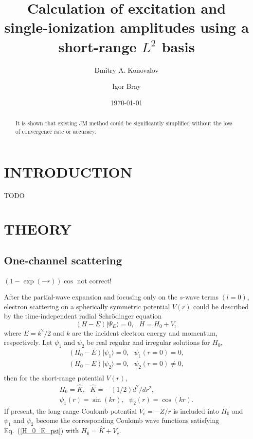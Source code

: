 \documentclass[aip
, pra
, showpacs
, aps
, twocolumn
, groupedaddress
, floatfix
]{revtex4}
\newcommand{\beq}{\begin{equation}}
\newcommand{\eeq}{\end{equation}}
\newcommand{\barr}{\begin{array}}
\newcommand{\earr}{\end{array}}
\begin{document}
\title {Calculation of excitation and single-ionization amplitudes using a short-range $L^2$ basis}

\author{Dmitry A. Konovalov}

\author{Igor Bray}


\date{\today}

\begin{abstract}
It is shown that existing JM method could be significantly simplified without the loss of convergence rate or accuracy.

\end{abstract}

\maketitle

\section{INTRODUCTION}
TODO

\section{THEORY}
\subsection{One-channel scattering}


$(1-\exp(-r))\cos$ \cite{Nesbet68} not correct!


After the partial-wave expansion \cite{Taylor72,N82} and focusing only on the $s$-wave terms $(l=0)$,
electron scattering on a spherically symmetric potential $V(r)$
could be described by the time-independent radial Schr\"odinger equation
\beq
(H-E) | \Psi_E \rangle =0,  \ \ \ H = H_0 + V, \label{H_E_Psi_E}
\eeq
where $E=k^2/2$ and $k$ are the incident electron energy and momentum, respectively. 
Let $\psi_1$ and $\psi_2$ be real regular and irregular solutions for $H_0$,
\beq \barr{l}
(H_0-E) | \psi_1 \rangle =0,  \ \ \ \psi_1(r=0) = 0,\\
(H_0-E) | \psi_2 \rangle =0,  \ \ \ \psi_2(r=0) \neq 0,\\
\earr \label{H_0_E_psi}\eeq
then for the short-range potential $V(r)$, 
\beq \barr{l}
H_0 = \hat{K},\ \ \ \hat{K} = -(1/2) d^2/dr^2,\\
\psi_1(r) = \sin(kr), \ \ \ \psi_2(r) = \cos(kr).
\earr \label{K} \eeq
If present, the long-range Coulomb potential $V_c=-Z/r$ is included into $H_0$ 
and $\psi_1$ and $\psi_2$ become the corresponding Coulomb wave functions satisfying Eq.~(\ref{H_0_E_psi})
with $H_0 = \hat{K} + V_c$.  
\end{document}
